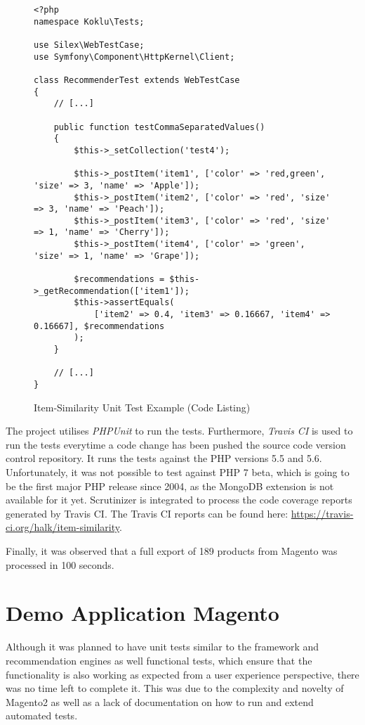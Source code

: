 \begin{figure}[!ht]
    \begin{verbatim}
<?php
namespace Koklu\Tests;

use Silex\WebTestCase;
use Symfony\Component\HttpKernel\Client;

class RecommenderTest extends WebTestCase
{
    // [...]

    public function testCommaSeparatedValues()
    {
        $this->_setCollection('test4');

        $this->_postItem('item1', ['color' => 'red,green', 'size' => 3, 'name' => 'Apple']);
        $this->_postItem('item2', ['color' => 'red', 'size' => 3, 'name' => 'Peach']);
        $this->_postItem('item3', ['color' => 'red', 'size' => 1, 'name' => 'Cherry']);
        $this->_postItem('item4', ['color' => 'green', 'size' => 1, 'name' => 'Grape']);

        $recommendations = $this->_getRecommendation(['item1']);
        $this->assertEquals(
            ['item2' => 0.4, 'item3' => 0.16667, 'item4' => 0.16667], $recommendations
        );
    }

    // [...]
}
    \end{verbatim}
    \caption{Item-Similarity Unit Test Example (Code Listing)}
    \label{fig:testing-itemsimilarity-similarity}
\end{figure}

The project utilises \emph{PHPUnit} to run the tests. Furthermore, \emph{Travis CI} is used to run the tests everytime a code change has been pushed the source code version control repository. It runs the tests against the PHP versions 5.5 and 5.6. Unfortunately, it was not possible to test against PHP 7 beta, which is going to be the first major PHP release since 2004, as the MongoDB extension is not available for it yet. Scrutinizer is integrated to process the code coverage reports generated by Travis CI. The Travis CI reports can be found here: \url{https://travis-ci.org/halk/item-similarity}.

Finally, it was observed that a full export of 189 products from Magento was processed in 100 seconds.

\section{Demo Application Magento}

Although it was planned to have unit tests similar to the framework and recommendation engines as well functional tests, which ensure that the functionality is also working as expected from a user experience perspective, there was no time left to complete it. This was due to the complexity and novelty of Magento2 as well as a lack of documentation on how to run and extend automated tests.

